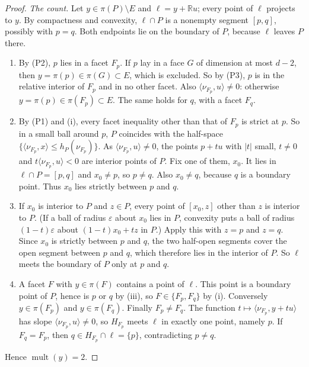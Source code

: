 \documentclass[11pt]{article}
\newcommand{\R}{\mathbb R}
\DeclareMathOperator{\mult}{mult}
\begin{document}
\begin{proof}
\emph{The count.} Let \(y\in\pi(P)\setminus E\) and
\(\ell=y+\R u\); every point of \(\ell\) projects to \(y\). By compactness
and convexity, \(\ell\cap P\) is a nonempty segment \([p,q]\), possibly
with \(p=q\). Both endpoints lie on the boundary of \(P\), because \(\ell\)
leaves \(P\) there.
\begin{enumerate}[label=(\roman*),leftmargin=2.5em,itemsep=2pt]
\item By (P2), \(p\) lies in a facet \(F_p\). If \(p\) lay in a face \(G\)
 of dimension at most \(d-2\), then \(y=\pi(p)\in\pi(G)\subset E\), which
 is excluded. So by (P3), \(p\) is in the relative interior of \(F_p\) and
 in no other facet. Also \(\langle\nu_{F_p},u\rangle\ne0\): otherwise
 \(y=\pi(p)\in\pi(F_p)\subset E\). The same holds for \(q\), with a facet
 \(F_q\).
\item By (P1) and (i), every facet inequality other than that of \(F_p\) is
 strict at \(p\). So in a small ball around \(p\), \(P\) coincides with the
 half-space \(\{\langle\nu_{F_p},x\rangle\le h_P(\nu_{F_p})\}\). As
 \(\langle\nu_{F_p},u\rangle\ne0\), the points \(p+tu\) with \(|t|\) small,
 \(t\ne0\) and \(t\langle\nu_{F_p},u\rangle<0\) are interior points of
 \(P\). Fix one of them, \(x_0\). It lies in \(\ell\cap P=[p,q]\) and
 \(x_0\ne p\), so \(p\ne q\). Also \(x_0\ne q\), because \(q\) is a
 boundary point. Thus \(x_0\) lies strictly between \(p\) and \(q\).
\item If \(x_0\) is interior to \(P\) and \(z\in P\), every point of
 \([x_0,z]\) other than \(z\) is interior to \(P\). (If a ball of radius
 \(\varepsilon\) about \(x_0\) lies in \(P\), convexity puts a ball of
 radius \((1-t)\varepsilon\) about \((1-t)x_0+tz\) in \(P\).) Apply this
 with \(z=p\) and \(z=q\). Since \(x_0\) is strictly between \(p\) and
 \(q\), the two half-open segments cover the open segment between \(p\) and
 \(q\), which therefore lies in the interior of \(P\). So \(\ell\) meets
 the boundary of \(P\) only at \(p\) and \(q\).
\item A facet \(F\) with \(y\in\pi(F)\) contains a point of \(\ell\). This
 point is a boundary point of \(P\), hence is \(p\) or \(q\) by (iii), so
 \(F\in\{F_p,F_q\}\) by (i). Conversely \(y\in\pi(F_p)\) and
 \(y\in\pi(F_q)\). Finally \(F_p\ne F_q\). The function
 \(t\mapsto\langle\nu_{F_p},y+tu\rangle\) has slope
 \(\langle\nu_{F_p},u\rangle\ne0\), so \(H_{F_p}\) meets \(\ell\) in exactly
 one point, namely \(p\). If \(F_q=F_p\), then
 \(q\in H_{F_p}\cap\ell=\{p\}\), contradicting \(p\ne q\).
\end{enumerate}
Hence \(\mult(y)=2\).


\end{proof}
\end{document}
